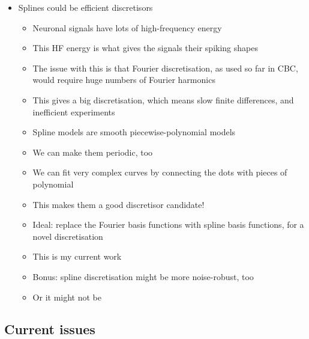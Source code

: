 \documentclass[11pt]{article}
\begin{document}
\begin{itemize}
\item Splines could be efficient discretisors
\begin{itemize}
\item Neuronal signals have lots of high-frequency energy
\item This HF energy is what gives the signals their spiking shapes
\item The issue with this is that Fourier discretisation, as used so far in CBC, would require huge numbers of Fourier harmonics
\item This gives a big discretisation, which means slow finite differences, and inefficient experiments
\item Spline models are smooth piecewise-polynomial models
\item We can make them periodic, too
\item We can fit very complex curves by connecting the dots with pieces of polynomial
\item This makes them a good discretisor candidate!
\item Ideal: replace the Fourier basis functions with spline basis functions, for a novel discretisation
\item This is my current work
\item Bonus: spline discretisation might be more noise-robust, too
\item Or it might not be
\end{itemize}
\end{itemize}

\subsection{Current issues}
\label{sec:org98983d2}
\end{document}
